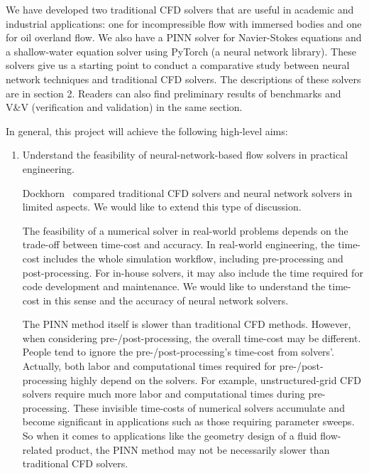 We have developed two traditional CFD solvers that are useful in academic and industrial applications: one for incompressible flow with immersed bodies and one for oil overland flow.
We also have a PINN solver for Navier-Stokes equations and a shallow-water equation solver using PyTorch (a neural network library).
These solvers give us a starting point to conduct a comparative study between neural network techniques and traditional CFD solvers.
The descriptions of these solvers are in section 2.
Readers can also find preliminary results of benchmarks and V\&V (verification and validation) in the same section.

In general, this project will achieve the following high-level aims:
\begin{enumerate}[label=Aim \arabic*]

    \item Understand the feasibility of neural-network-based flow solvers in practical engineering.

        Dockhorn~\cite{dockhorn_discussion_2019} compared traditional CFD solvers and neural network solvers in limited aspects.
        We would like to extend this type of discussion.

        The feasibility of a numerical solver in real-world problems depends on the trade-off between time-cost and accuracy.
        In real-world engineering, the time-cost includes the whole simulation workflow, including pre-processing and post-processing.
        For in-house solvers, it may also include the time required for code development and maintenance.
        We would like to understand the time-cost in this sense and the accuracy of neural network solvers.

        The PINN method itself is slower than traditional CFD methods.
        However, when considering pre-/post-processing, the overall time-cost may be different.
        People tend to ignore the pre-/post-processing's time-cost from solvers'.
        Actually, both labor and computational times required for pre-/post-processing highly depend on the solvers.
        For example, unstructured-grid CFD solvers require much more labor and computational times during pre-processing.
        These invisible time-costs of numerical solvers accumulate and become significant in applications such as those requiring parameter sweeps.
        So when it comes to applications like the geometry design of a fluid flow-related product, the PINN method may not be necessarily slower than traditional CFD solvers.


\end{enumerate}
